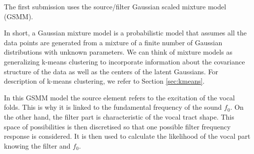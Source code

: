 The first submission uses the source/filter Gaussian scaled mixture model (GSMM). 

In short, a Gaussian mixture model is a probabilistic model that assumes all the data points are generated from a mixture of a finite number of Gaussian distributions with unknown parameters. We can think of mixture models as generalizing k-means clustering to incorporate information about the covariance structure of the data as well as the centers of the latent Gaussians. For description of k-means clustering, we refer to Section \ref{sec:kmeans}.

In this GSMM model the source element refers to the excitation of the vocal folds. This is why it is linked to the fundamental frequency of the sound $f_{\text{0}}$. On the other hand, the filter part is characteristic of the vocal tract shape. This space of possibilities is then discretised so that one possible filter frequency response is considered. It is then used to calculate the likelihood of the vocal part knowing the filter and $f_{\text{0}}$.

